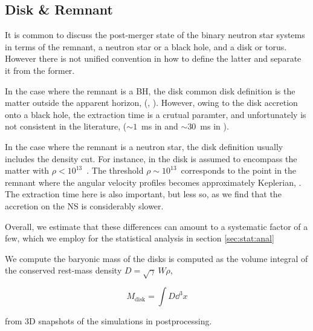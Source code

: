 \subsection{Disk \& Remnant}

It is common to discuss the post-merger state of the binary neutron star systems in terms of the remnant, a neutron star or a black hole, and a disk or torus. However there is not unified convention in how to define the latter and separate it from the former. 

In the case where the remnant is a BH, the disk common disk definition is the matter outside the apparent horizon, (\eg, \cite{Dietrich:2015iva,Dietrich:2016hky}). 
However, owing to the disk accretion onto a black hole, the extraction time is a crutual paramter, and unfortunately is not consistent in the literature, (\eg $\sim1$~ms in \cite{Dietrich:2015iva,Dietrich:2016hky} and $\sim30$~ms in \cite{Sekiguchi:2016bjd}).

In the case where the remnant is a neutron star, the disk definition usually includes the density cut. For instance, in \cite{Radice:2018pdn,Kiuchi:2019lls,Vincent:2019kor} the disk is assumed to encompass the matter with $\rho < 10^{13}$~\gcm. 
The threshold $\rho\sim 10^{13}$~\gcm corresponds to the point in the remnant where
the angular velocity profiles becomes approximately Keplerian, \citep[\eg][]{Shibata:2005ss,Shibata:2006nm,Hanauske:2016gia,Kastaun:2016elu}.
The extraction time here is also important, but less so, as we find that the accretion on the NS is considerably slower.

Overall, we estimate that these differences can amount to a systematic factor of a few,
which we employ for the statistical analysis in section \ref{sec:stat:anal}


We compute the baryonic mass of the disks is computed as the volume integral of the conserved rest-mass density $D=\sqrt{\gamma}~W\rho$,

\begin{equation}
\label{eq:method:mdisk}
M_{\text{disk}} = \int D \dd^3 x
\end{equation}

from 3D snapshots of the simulations in postprocessing.






